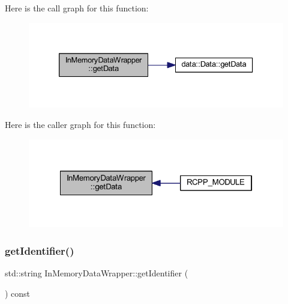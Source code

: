 Here is the call graph for this function\+:\nopagebreak
\begin{figure}[H]
\begin{center}
\leavevmode
\includegraphics[width=333pt]{class_in_memory_data_wrapper_a69c754048807d42d8178914e8339a808_cgraph}
\end{center}
\end{figure}
Here is the caller graph for this function\+:\nopagebreak
\begin{figure}[H]
\begin{center}
\leavevmode
\includegraphics[width=322pt]{class_in_memory_data_wrapper_a69c754048807d42d8178914e8339a808_icgraph}
\end{center}
\end{figure}
\mbox{\label{class_in_memory_data_wrapper_a2a81d397debd1c568f638004090cbdef}} 
\subsubsection{\texorpdfstring{get\+Identifier()}{getIdentifier()}}
{\footnotesize\ttfamily std\+::string In\+Memory\+Data\+Wrapper\+::get\+Identifier (\begin{DoxyParamCaption}{ }\end{DoxyParamCaption}) const\hspace{0.3cm}{\ttfamily [inline]}}

